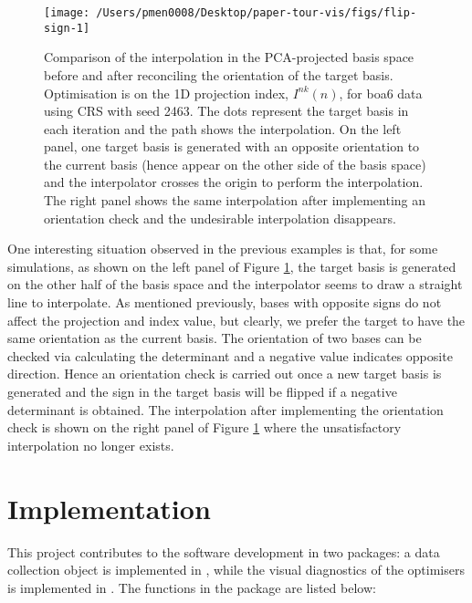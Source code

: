 \begin{Schunk}
\begin{figure}

{\centering \texttt{[image: /Users/pmen0008/Desktop/paper-tour-vis/figs/flip-sign-1]} 

}

\caption[Comparison of the interpolation in the PCA-projected basis space before and after reconciling the orientation of the target basis]{Comparison of the interpolation in the PCA-projected basis space before and after reconciling the orientation of the target basis. Optimisation is on the 1D projection index, $I^{nk}(n)$, for boa6 data using CRS with seed 2463. The dots represent the target basis in each iteration and the path shows the interpolation. On the left panel, one target basis is generated with an opposite orientation to the current basis (hence appear on the other side of the basis space) and the interpolator crosses the origin to perform the interpolation. The right panel shows the same interpolation after implementing an orientation check and the undesirable interpolation disappears.}\label{fig:flip-sign}
\end{figure}
\end{Schunk}

One interesting situation observed in the previous examples is that, for
some simulations, as shown on the left panel of Figure
\ref{fig:flip-sign}, the target basis is generated on the other half of
the basis space and the interpolator seems to draw a straight line to
interpolate. As mentioned previously, bases with opposite signs do not
affect the projection and index value, but clearly, we prefer the target
to have the same orientation as the current basis. The orientation of
two bases can be checked via calculating the determinant and a negative
value indicates opposite direction. Hence an orientation check is
carried out once a new target basis is generated and the sign in the
target basis will be flipped if a negative determinant is obtained. The
interpolation after implementing the orientation check is shown on the
right panel of Figure \ref{fig:flip-sign} where the unsatisfactory
interpolation no longer exists.

\hypertarget{implementation}{%
\section{Implementation}\label{implementation}}

This project contributes to the software development in two packages: a
data collection object is implemented in  \citep{tourr},
while the visual diagnostics of the optimisers is implemented in
 \citep{ferrn}. The functions in the 
\citep{ferrn} package are listed below:

